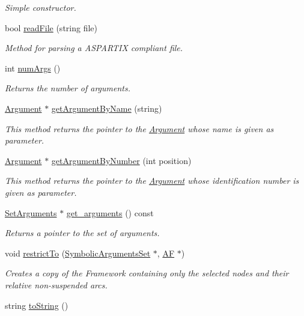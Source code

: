 \begin{DoxyCompactItemize}
\begin{DoxyCompactList}\small\item\em Simple constructor. \end{DoxyCompactList}\item 
bool \hyperlink{classAF_a40b85b5c4cb3d96273dd0becacad1a79}{read\-File} (string file)
\begin{DoxyCompactList}\small\item\em Method for parsing a A\-S\-P\-A\-R\-T\-I\-X compliant file. \end{DoxyCompactList}\item 
int \hyperlink{classAF_a48e30f0573d51a9995093644bb19bb33}{num\-Args} ()
\begin{DoxyCompactList}\small\item\em Returns the number of arguments. \end{DoxyCompactList}\item 
\hyperlink{classArgument}{Argument} $\ast$ \hyperlink{classAF_ab2eccb345f0ebfc6fc2b5cb9f456651b}{get\-Argument\-By\-Name} (string)
\begin{DoxyCompactList}\small\item\em This method returns the pointer to the \hyperlink{classArgument}{Argument} whose name is given as parameter. \end{DoxyCompactList}\item 
\hyperlink{classArgument}{Argument} $\ast$ \hyperlink{classAF_a370edb6cf152935b65e848d1ae209546}{get\-Argument\-By\-Number} (int position)
\begin{DoxyCompactList}\small\item\em This method returns the pointer to the \hyperlink{classArgument}{Argument} whose identification number is given as parameter. \end{DoxyCompactList}\item 
\hyperlink{classSetArguments}{Set\-Arguments} $\ast$ \hyperlink{classAF_ac415a440c526e9a06a938544503fe741}{get\-\_\-arguments} () const 
\begin{DoxyCompactList}\small\item\em Returns a pointer to the set of arguments. \end{DoxyCompactList}\item 
void \hyperlink{classAF_a4cedca2ce81ac1a4aa0be5931dce4a51}{restrict\-To} (\hyperlink{classSymbolicArgumentsSet}{Symbolic\-Arguments\-Set} $\ast$, \hyperlink{classAF}{A\-F} $\ast$)
\begin{DoxyCompactList}\small\item\em Creates a copy of the Framework containing only the selected nodes and their relative non-\/suspended arcs. \end{DoxyCompactList}\item 
\hypertarget{classAF_afb49c1335663b94a968f553eefc11f95}{string \hyperlink{classAF_afb49c1335663b94a968f553eefc11f95}{to\-String} ()}\label{classAF_afb49c1335663b94a968f553eefc11f95}


\end{DoxyCompactItemize}
